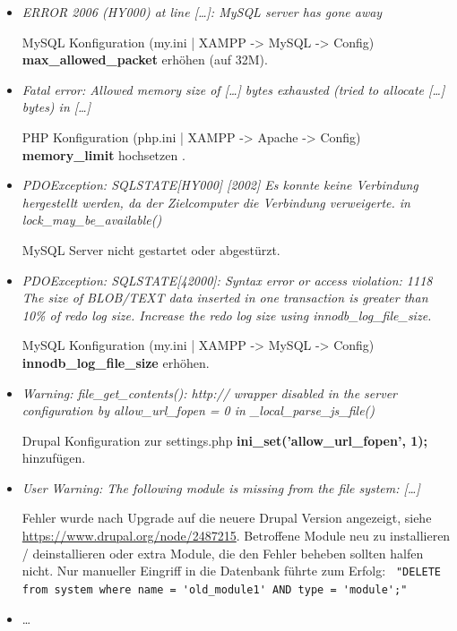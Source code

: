\begin{itemize}[parsep=0pt, itemsep=5.0pt plus 2.0pt minus 1.0pt, leftmargin=*]
	\item \textit{ERROR 2006 (HY000) at line [\dots]: MySQL server has gone away}

	MySQL Konfiguration (my.ini | XAMPP -> MySQL -> Config)
	\textbf{max\_allowed\_packet} erhöhen (\zB auf 32M).


	\item \textit{Fatal error: Allowed memory size of [\dots] bytes exhausted (tried to allocate [\dots] bytes) in [\dots]}

	PHP Konfiguration (php.ini | XAMPP -> Apache -> Config)
	\textbf{memory\_limit} hochsetzen .


	\item \textit{PDOException: SQLSTATE[HY000] [2002] Es konnte keine Verbindung hergestellt werden, da der Zielcomputer die Verbindung verweigerte. in lock\_may\_be\_available()}

	MySQL Server nicht gestartet oder abgestürzt.


	\item \textit{PDOException: SQLSTATE[42000]: Syntax error or access violation: 1118 The size of BLOB/TEXT data inserted in one transaction is greater than 10\% of redo log size. Increase the redo log size using innodb\_log\_file\_size.}

	MySQL Konfiguration (my.ini | XAMPP -> MySQL -> Config)
	\textbf{innodb\_log\_file\_size} erhöhen.


	\item \textit{Warning: file\_get\_contents(): http:// wrapper disabled in the server configuration by allow\_url\_fopen = 0 in \_local\_parse\_js\_file()}

	Drupal Konfiguration zur settings.php \textbf{ini\_set('allow\_url\_fopen', 1);} hinzufügen.


	\item \textit{User Warning: The following module is missing from the file system: [\dots]}

	Fehler wurde nach Upgrade auf die neuere Drupal Version angezeigt, siehe \url{https://www.drupal.org/node/2487215}.
	Betroffene Module neu zu installieren / deinstallieren oder extra Module, die den Fehler beheben sollten halfen nicht. Nur manueller Eingriff in die Datenbank führte zum Erfolg: \lstinline| "DELETE from system where name = 'old_module1' AND type = 'module';"|

	\item \dots {}
\end{itemize}


